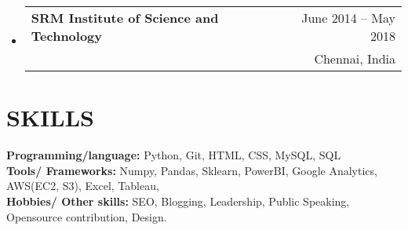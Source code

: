 \documentclass[letterpaper,11pt]{article}
\makeatletter
\newcommand{\resumeItem}[1]{
  \item\small{
    {#1 \vspace{-1pt}}
  }
}
\newcommand{\resumeSubheading}[4]{
  \vspace{-1pt}\item
    \begin{tabular*}{\textwidth}[t]{l@{\extracolsep{\fill}}r}
      \textbf{#1} & {\color{dark-grey}\small #2}\vspace{1pt}\\ %
      \text{#3} & {\color{dark-grey} \small #4}\\ %
    \end{tabular*}\vspace{-4pt}
}
\newcommand{\resumeSubHeadingListStart}{\begin{itemize}[leftmargin=0in, label={}]}
\newcommand{\resumeSubHeadingListEnd}{\end{itemize}}
\newcommand{\resumeItemListStart}{\begin{itemize}}
\newcommand{\resumeItemListEnd}{\end{itemize}\vspace{0pt}}
\makeatother
\begin{document}
  
  \resumeSubHeadingListStart
    \resumeSubheading
      {SRM Institute of Science and Technology}{June 2014 -- May 2018}
      {Bachelor in Technology(B.Tech) - Computer Science - CGPA 7.8/10}{Chennai, India}

  \resumeSubHeadingListEnd

%

\section{SKILLS}
 \begin{itemize}[leftmargin=0in, label={}]
    \small{\item{
     \textbf{Programming/language:} { Python, Git, HTML, CSS, MySQL, SQL}\vspace{2pt} \\
     \textbf{Tools/ Frameworks:} {   Numpy, Pandas, Sklearn, PowerBI, Google Analytics, AWS(EC2, S3), Excel, Tableau,  } \\
     \textbf{Hobbies/ Other skills:} {SEO, Blogging, Leadership, Public Speaking, Opensource contribution, Design.}\
     
    }}
 \end{itemize}




  
\end{document}
